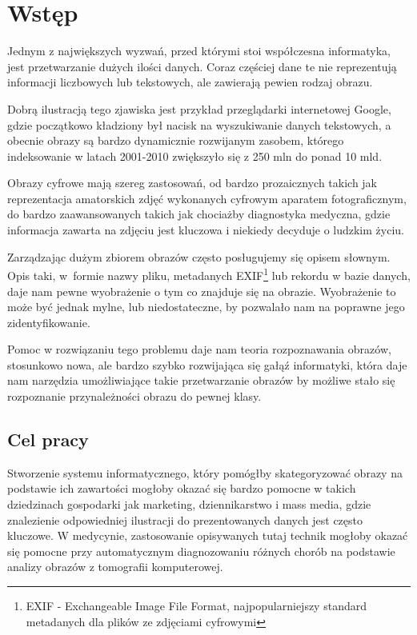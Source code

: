 \chapter*{Wstęp}

Jednym z największych wyzwań, przed którymi stoi współczesna informatyka, jest przetwarzanie dużych ilości danych. Coraz częściej dane te nie reprezentują informacji liczbowych lub tekstowych, ale zawierają pewien rodzaj obrazu. 

Dobrą ilustracją tego zjawiska jest przykład przeglądarki internetowej Google, gdzie początkowo kładziony był nacisk na wyszukiwanie danych tekstowych, a obecnie obrazy są bardzo dynamicznie rozwijanym zasobem, którego indeksowanie w latach 2001-2010 zwiększyło się z 250 mln do ponad 10 mld.\cite{Google2010} 

Obrazy cyfrowe mają szereg zastosowań, od bardzo prozaicznych takich jak reprezentacja amatorskich zdjęć wykonanych cyfrowym aparatem fotograficznym, do bardzo zaawansowanych takich jak chociażby diagnostyka medyczna, gdzie informacja zawarta na zdjęciu jest kluczowa i niekiedy decyduje o ludzkim życiu.

Zarządzając dużym zbiorem obrazów często posługujemy się opisem słownym. Opis taki, w~formie nazwy pliku, metadanych EXIF\footnote{EXIF - Exchangeable Image File Format, najpopularniejszy standard metadanych dla plików ze zdjęciami cyfrowymi} lub rekordu w bazie danych, daje nam pewne wyobrażenie o tym co znajduje się na obrazie. Wyobrażenie to może być jednak mylne, lub niedostateczne, by pozwalało nam na poprawne jego zidentyfikowanie.

Pomoc w rozwiązaniu tego problemu daje nam teoria rozpoznawania obrazów, stosunkowo nowa, ale bardzo szybko rozwijająca się gałąź informatyki, która daje nam narzędzia umożliwiające takie przetwarzanie obrazów by możliwe stało się rozpoznanie przynależności obrazu do pewnej klasy.\cite{Tad91}


\section*{Cel pracy}

Stworzenie systemu informatycznego, który pomógłby skategoryzować obrazy na podstawie ich zawartości mogłoby okazać się bardzo pomocne w takich dziedzinach gospodarki jak marketing, dziennikarstwo i mass media, gdzie znalezienie odpowiedniej ilustracji do prezentowanych danych jest często kluczowe. W medycynie, zastosowanie opisywanych tutaj technik mogłoby okazać się pomocne przy automatycznym diagnozowaniu różnych chorób na podstawie analizy obrazów z tomografii komputerowej.

